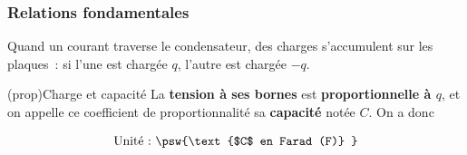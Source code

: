\documentclass[../../main/main.tex]{subfiles}
\begin{document}
\subsubsection{Relations fondamentales}
Quand un courant traverse le condensateur, des charges s'accumulent sur
les plaques~: si l'une est chargée $q$, l'autre est chargée $-q$.
\begin{tcb*}[label=prop:Ccondens, sidebyside, righthand ratio=.3](prop){Charge et capacité}
	La \textbf{tension à ses bornes} est \textbf{proportionnelle à $q$}, et on
	appelle ce coefficient de proportionnalité sa \textbf{capacité} notée $C$.
	On a donc
	\smallbreak
	\begin{isd}[sidebyside align=top]
		\psw{%
			\[\boxed{q = Cu}\]
		}%
		\vspace{-15pt}
		\tcblower
		\vspace{-10pt}
		\[
			\text{Unité~:~}
			\psw{%
				\text{$C$ en Farad (F)}
			}%
		\]
	\end{isd}
	\tcblower
	\vspace{-10pt}
	\begin{center}
		\vspace{-10pt}
	\end{center}
\end{tcb*}
\end{document}
